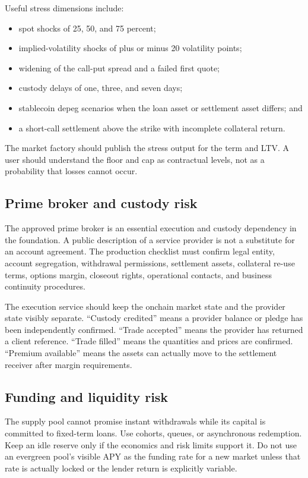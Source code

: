 \documentclass[11pt,oneside]{article}
\begin{document}
Useful stress dimensions include:

\begin{itemize}
\item spot shocks of 25, 50, and 75 percent;
\item implied-volatility shocks of plus or minus 20 volatility points;
\item widening of the call-put spread and a failed first quote;
\item custody delays of one, three, and seven days;
\item stablecoin depeg scenarios when the loan asset or settlement asset differs; and
\item a short-call settlement above the strike with incomplete collateral return.
\end{itemize}

The market factory should publish the stress output for the term and LTV. A user should understand the floor and cap as contractual levels, not as a probability that losses cannot occur.

\subsection{Prime broker and custody risk}

The approved prime broker is an essential execution and custody dependency in the foundation. A public description of a service provider is not a substitute for an account agreement. The production checklist must confirm legal entity, account segregation, withdrawal permissions, settlement assets, collateral re-use terms, options margin, closeout rights, operational contacts, and business continuity procedures.

The execution service should keep the onchain market state and the provider state visibly separate. ``Custody credited'' means a provider balance or pledge has been independently confirmed. ``Trade accepted'' means the provider has returned a client reference. ``Trade filled'' means the quantities and prices are confirmed. ``Premium available'' means the assets can actually move to the settlement receiver after margin requirements.

\subsection{Funding and liquidity risk}

The supply pool cannot promise instant withdrawals while its capital is committed to fixed-term loans. Use cohorts, queues, or asynchronous redemption. Keep an idle reserve only if the economics and risk limits support it. Do not use an evergreen pool's visible APY as the funding rate for a new market unless that rate is actually locked or the lender return is explicitly variable.
\end{document}
